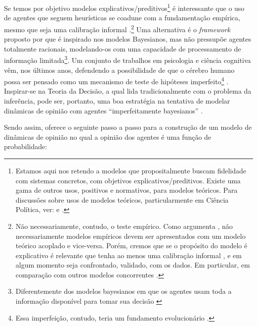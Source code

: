 Se temos por objetivo modelos explicativos/preditivos\footnote{Estamos aqui nos
  retendo a modelos que propositalmente buscam fidelidade com sistemas
  concretos, com objetivos explicativos/preditivos. Existe uma gama de outros
  usos, positivos e normativos, para modelos teóricos. Para discussões sobre
  usos de modelos teóricos, particularmente em Ciência Política, ver:
   e .} é interessante
que o uso de agentes que seguem heurísticas se coadune com a fundamentação
empírica, mesmo que seja uma calibração informal \cite{flache2017}.\footnote{Não
  necessariamente, contudo, o teste empírico. Como argumenta
  , não necessariamente modelos empíricos devem ser
  apresentados com um modelo teórico acoplado e vice-versa. Porém, cremos que se
  o propósito do modelo é explicativo  é relevante que tenha  ao menos uma calibração
  informal \cite{flache2017}, e em algum momento seja confrontado, validado,
  com os dados. Em particular, em comparação com outros modelos concorrentes
  \cite{clarke2012model}. } Uma alternativa é o \textit{framework} proposto por
 que é inspirado nos modelos Bayesianos, mas não
pressupõe agentes totalmente racionais, modelando-os com uma capacidade de
processamento de informação limitada\footnote{Diferentemente dos modelos
  bayesianos em que os agentes usam toda a informação disponível para tomar sua
  decisão \cite{jackman2009bayesian}}. Um conjunto de trabalhos em psicologia e
ciência cognitiva vêm, nos últimos anos, defendendo a possibilidade de que o
cérebro humano possa ser pensado como um mecanismo de teste de hipóteses
imperfeito\footnote{Essa imperfeição, contudo, teria um fundamento evolucionário
  \cite{price2016hierarchical,martins2005adaptive}.}
\cite{hohwy2013predictive,sanborn2016bayesian}. Inspirar-se na Teoria da
Decisão, a qual lida tradicionalmente com o problema da inferência, pode ser,
portanto, uma boa estratégia na tentativa de modelar dinâmicas de opinião com
agentes ``imperfeitamente bayesianos''
\cite{griffiths2006optimal,fujikawa2007perfect,baker2017rational}.

Sendo assim,  oferece o seguinte passo a passo
para a construção de um modelo de dinâmicas de opinião no qual a opinião dos
agentes é uma função de probabilidade:


